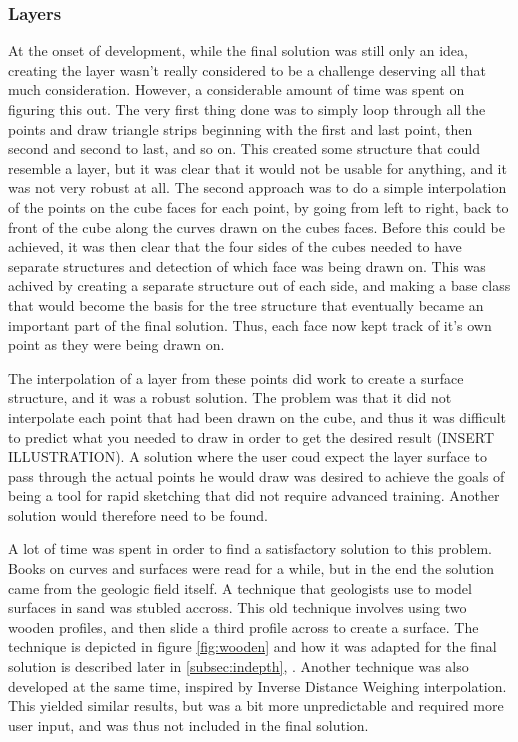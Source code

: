 \documentclass[a4paper,12pt]{article}
\newcommand{\secref}[1]{\autoref{#1}, \nameref{#1}}
\begin{document}
\subsubsection{Layers}
\label{subsec:layers}
At the onset of development, while the final solution was still only an idea, creating the layer wasn't really considered to be a challenge deserving all that much consideration. However, a considerable amount of time was spent on figuring this out. The very first thing done was to simply loop through all the points and draw triangle strips beginning with the first and last point, then second and second to last, and so on. This created some structure that could resemble a layer, but it was clear that it would not be usable for anything, and it was not very robust at all. The second approach was to do a simple interpolation of the points on the cube faces for each point, by going from left to right, back to front of the cube along the curves drawn on the cubes faces. Before this could be achieved, it was then clear that the four sides of the cubes needed to have separate structures and detection of which face was being drawn on. This was achived by creating a separate structure out of each side, and making a 
base class that would become the basis for the tree structure that eventually became an important part of the final solution. Thus, each face now kept track of it's own point as they were being drawn on.

The interpolation of a layer from these points did work to create a surface structure, and it was a robust solution. The problem was that it did not interpolate each point that had been drawn on the cube, and thus it was difficult to predict what you needed to draw in order to get the desired result (INSERT ILLUSTRATION). A solution where the user coud expect the layer surface to pass through the actual points he would draw was desired to achieve the goals of being a tool for rapid sketching that did not require advanced training. Another solution would therefore need to be found.

A lot of time was spent in order to find a satisfactory solution to this problem. Books on curves and surfaces were read for a while, but in the end the solution came from the geologic field itself. A technique that geologists use to model surfaces in sand was stubled accross. This old technique involves using two wooden profiles, and then slide a third profile across to create a surface. The technique is depicted in figure \ref{fig:wooden} and how it was adapted for the final solution is described later in \secref{subsec:indepth}. Another technique was also developed at the same time, inspired by Inverse Distance Weighing interpolation. This yielded similar results, but was a bit more unpredictable and required more user input, and was thus not included in the final solution.
\end{document}
